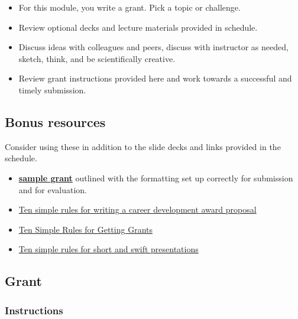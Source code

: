 \documentclass[
]{book}
\providecommand{\tightlist}{%
  \setlength{\itemsep}{0pt}\setlength{\parskip}{0pt}}
\begin{document}
\begin{itemize}
\tightlist
\item
  For this module, you write a grant. Pick a topic or challenge.\\
\item
  Review optional decks and lecture materials provided in schedule.\\
\item
  Discuss ideas with colleagues and peers, discuss with instructor as needed, sketch, think, and be scientifically creative.\\
\item
  Review grant instructions provided here and work towards a successful and timely submission.
\end{itemize}

\hypertarget{bonus-resources}{%
\subsection*{Bonus resources}\label{bonus-resources}}

Consider using these in addition to the slide decks and links provided in the schedule.

\begin{itemize}
\item
  \href{https://figshare.com/articles/online_resource/BIOL3250_grant_template/13224755}{\textbf{sample grant}} outlined with the formatting set up correctly for submission and for evaluation.
\item
  \href{https://journals.plos.org/ploscompbiol/article?id=10.1371/journal.pcbi.1005863}{Ten simple rules for writing a career development award proposal}
\item
  \href{https://journals.plos.org/ploscompbiol/article?id=10.1371/journal.pcbi.0020012}{Ten Simple Rules for Getting Grants}
\item
  \href{https://journals.plos.org/ploscompbiol/article?id=10.1371/journal.pcbi.1005373}{Ten simple rules for short and swift presentations}
\end{itemize}

\hypertarget{grant-1}{%
\subsection*{Grant}\label{grant-1}}

\hypertarget{instructions-1}{%
\subsubsection*{Instructions}\label{instructions-1}}
\end{document}
